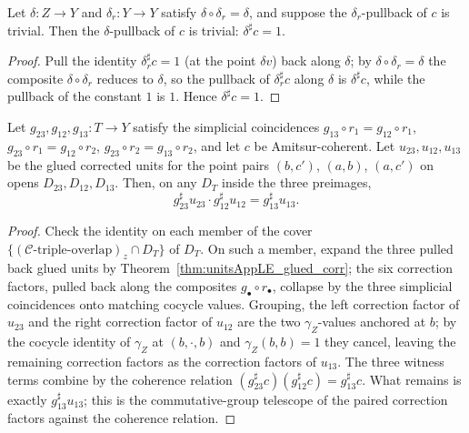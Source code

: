 \begin{theorem}
  \label{thm:unitsAppLE_diag_eq_one_of_coherent}
  \leanok
  Let \(\delta \colon Z \to Y\) and \(\delta_r \colon Y \to Y\) satisfy \(\delta \circ
  \delta_r = \delta\), and suppose the \(\delta_r\)-pullback of \(c\) is trivial. Then the
  \(\delta\)-pullback of \(c\) is trivial: \(\delta^{\sharp} c = 1\).
\end{theorem}
\begin{proof}
  \leanok
  Pull the identity \(\delta_r^{\sharp} c = 1\) (at the point \(\delta v\)) back along
  \(\delta\); by \(\delta \circ \delta_r = \delta\) the composite \(\delta \circ \delta_r\)
  reduces to \(\delta\), so the pullback of \(\delta_r^{\sharp} c\) along \(\delta\) is
  \(\delta^{\sharp} c\), while the pullback of the constant \(1\) is \(1\). Hence
  \(\delta^{\sharp} c = 1\).
\end{proof}

\begin{theorem}
  \label{thm:glued_corr_amitsur}
  \leanok
  Let \(g_{23}, g_{12}, g_{13} \colon T \to Y\) satisfy the simplicial coincidences
  \(g_{13} \circ r_1 = g_{12} \circ r_1\), \(g_{23} \circ r_1 = g_{12} \circ r_2\),
  \(g_{23} \circ r_2 = g_{13} \circ r_2\), and let \(c\) be Amitsur-coherent. Let \(u_{23},
  u_{12}, u_{13}\) be the glued corrected units for the point pairs \((b, c')\), \((a, b)\),
  \((a, c')\) on opens \(D_{23}, D_{12}, D_{13}\). Then, on any \(D_T\) inside the three
  preimages,
  \[
    g_{23}^{\sharp} u_{23} \cdot g_{12}^{\sharp} u_{12} = g_{13}^{\sharp} u_{13} .
  \]
\end{theorem}
\begin{proof}
  \leanok
  Check the identity on each member of the cover \(\{(\mathcal C\text{-triple-overlap})_z \cap
  D_T\}\) of \(D_T\). On such a member, expand the three pulled back glued units by
  Theorem~\ref{thm:unitsAppLE_glued_corr}; the six correction factors, pulled back along the
  composites \(g_{\bullet} \circ r_{\bullet}\), collapse by the three simplicial coincidences
  onto matching cocycle values. Grouping, the left correction factor of \(u_{23}\) and the
  right correction factor of \(u_{12}\) are the two \(\gamma_Z\)-values anchored at \(b\); by
  the cocycle identity of \(\gamma_Z\) at \((b, \cdot, b)\) and \(\gamma_Z(b,b) = 1\) they
  cancel, leaving the remaining correction factors as the correction factors of \(u_{13}\). The
  three witness terms combine by the coherence relation
  \((g_{23}^{\sharp} c)(g_{12}^{\sharp} c) = g_{13}^{\sharp} c\). What remains is exactly
  \(g_{13}^{\sharp} u_{13}\); this is the commutative-group telescope of the paired correction
  factors against the coherence relation.
\end{proof}

